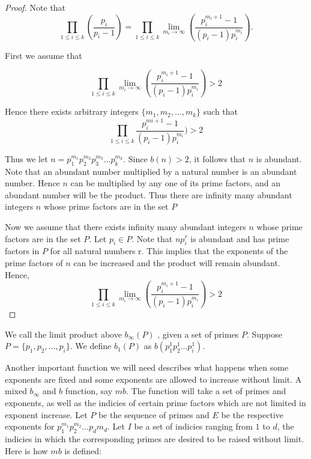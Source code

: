 \documentclass[../paper.tex]{article}
\begin{document}
\begin{proof}

Note that
%  
$$\prod_{1 \leq i \leq k} (\frac{p_{i}}{p_{i} -1}) 
%
= \prod_{1 \leq i \leq k} \lim_{m_i \rightarrow \infty} 
%
( \frac{p_i^{m_{i} + 1} -1}{(p_i -1)p_{i}^{m_{i}}}). $$

First we assume that

  
$$\prod_{1 \leq i \leq k} \lim_{m_i \rightarrow \infty} 
( \frac{p_i^{m_{i} + 1} -1}{(p_i -1)p_{i}^{m_{i}}}) > 2$$

Hence there exists arbitrary integers $\{m_1, m_2, ... , m_k\}$ 
such that 
%
$$\prod_{1 \leq i \leq k} \frac{p_i^{m{i} + 1} -1}
{(p_i -1)p_{i}^{m_{i}}}) > 2$$
%

Thus we let $n=p_1^{m_1}p_2^{m_2}p_3^{m_3}...p_{k}^{m_k}$. 
Since $b(n) > 2$, it follows that $n$ is abundant. Note that an 
abundant number multiplied by a natural number is an abundant 
number. Hence $n$ can be multiplied by any one of its prime 
factors, and an abundant number will be the product. Thus there
are infinity many abundant integers $n$ whose prime factors are 
in the set $P$

Now we assume that there exists infinity many abundant integers 
$n$ whose prime factors are in the set $P$. Let $p_i \in P$. Note
that $np_i^r$ is abundant and has prime factors in $P$ for all 
natural numbers r. This implies that the exponents of the prime 
factors of $n$ can be increased and the product will remain abundant. Hence,
  $$\prod_{1 \leq i \leq k} \lim_{m_i \rightarrow \infty} ( \frac{p_i^{m_{i} + 1} -1}{(p_i -1)p_{i}^{m_{i}}}) > 2$$

\end{proof}

We call the limit product above $b_{\infty}(P)$ , given a set of primes
$P$. Suppose $P = \{p_1, p_2, ..., p_i \}$. We define $b_1(P)$ as
$b(p_1^1 p_2^1 ... p_i^1)$.

Another important function we will need describes what happens 
when some exponents are fixed and some exponents are allowed to
increase without limit. A mixed $b_{\infty}$ and $b$ function, 
say $mb$. The function will take a set of primes and exponents,
as well as the indicies of certain prime factors which are not
limited in exponent increase. Let $P$ be the sequence of primes 
and $E$ be the respective exponents for 
$p_1^{m_1} p_2^{m_2} ... p_d{m_d}$. Let $I$ be a set of indicies
ranging from $1$ to $d$, the indicies in which the corresponding
primes are desired to be raised without limit. Here is how $mb$
is defined:
\end{document}
